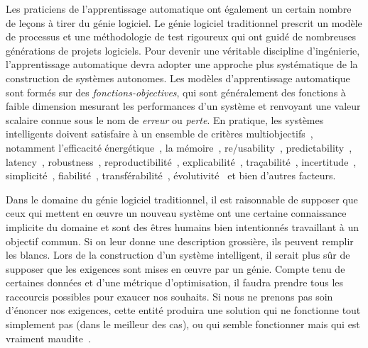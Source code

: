 Les praticiens de l'apprentissage automatique ont également un certain nombre de leçons à tirer du génie logiciel. Le génie logiciel traditionnel prescrit un modèle de processus et une méthodologie de test rigoureux qui ont guidé de nombreuses générations de projets logiciels. Pour devenir une véritable discipline d'ingénierie, l'apprentissage automatique devra adopter une approche plus systématique de la construction de systèmes autonomes. Les modèles d'apprentissage automatique sont formés sur des \textit{fonctions-objectives}, qui sont généralement des fonctions à faible dimension mesurant les performances d'un système et renvoyant une valeur scalaire connue sous le nom de \textit{erreur} ou \textit{perte}. En pratique, les systèmes intelligents doivent satisfaire à un ensemble de critères multiobjectifs~\citep{censi2015mathematical}, notamment l'efficacité énergétique~\citep{paull2010novel}, la mémoire~\citep{memory2013mitliagkas}, re/usability~\citep{breuleux2017automatic,deleu2019torchmeta}, predictability~\citep{turner2017well}, latency~\citep{ravanelli2018twin}, robustness~\citep{pineau2003policy}, reproductibilité~\citep{pineau2019improving}, explicabilité~\citep{turner2016model}, traçabilité~\citep{guo2017semantically, tsirigotis2018orion}, incertitude~\citep{diaz2018interactive}, simplicité~\citep{kastner2019representation}, fiabilité~\citep{xu2017efficient}, transférabilité~\citep{mehta2019active}, évolutivité~\citep{luan2019break} et bien d'autres facteurs.

Dans le domaine du génie logiciel traditionnel, il est raisonnable de supposer que ceux qui mettent en œuvre un nouveau système ont une certaine connaissance implicite du domaine et sont des êtres humains bien intentionnés travaillant à un objectif commun. Si on leur donne une description grossière, ils peuvent remplir les blancs. Lors de la construction d'un système intelligent, il serait plus sûr de supposer que les exigences sont mises en œuvre par un génie. Compte tenu de certaines données et d'une métrique d'optimisation, il faudra prendre tous les raccourcis possibles pour exaucer nos souhaits. Si nous ne prenons pas soin d'énoncer nos exigences, cette entité produira une solution qui ne fonctionne tout simplement pas (dans le meilleur des cas), ou qui semble fonctionner mais qui est vraiment maudite~\citep{bellman1957dynamic}.

